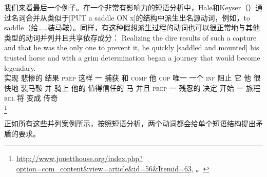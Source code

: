     我们来看最后一个例子。在一个非常有影响力的短语分析中，Hale和Keyser（\citeyear{HK93a-u}）通过名词合并从类似于[PUT a saddle ON x]的结构中派生出名源动词，例如，to saddle（给……装马鞍）。同样，有这种假想派生过程的动词也可以很正常地与其他类型的动词并列并且共享依存成分：
\ea
\gll Realizing the dire results of such a capture and that he was the only one to prevent it, he quickly [saddled and mounted] his trusted horse and with a grim determination began a journey that would become legendary.\\
    实现  悲惨的 结果 \textsc{prep} 这样 一 捕获 和 \textsc{comp} 他 \textsc{cop}  唯一 一个 \textsc{inf} 阻止 它 他 很快地 \spacebr{}装马鞍 并 骑上 他的 值得信任的 马 并且 \textsc{prep} 一 残忍的 决定 开始 一 旅程 \textsc{rel} 将 变成 传奇\\
\footnote{\url{http://www.jouetthouse.org/index.php?option=com_content&view=article&id=56&Itemid=63},
  。}  
\z

\noindent
正如所有这些\xnullc 并列案例所示，按照短语分析，两个动词都会给单个短语结构提出矛盾的要求。


